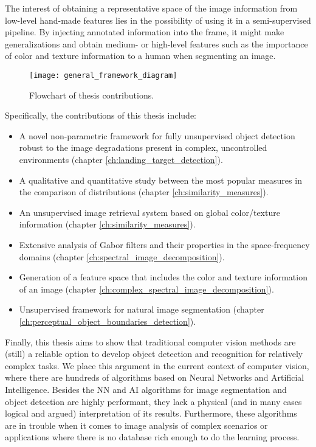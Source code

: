 The interest of obtaining a representative space of the image information from low-level hand-made features lies in the possibility of using it in a semi-supervised pipeline. By injecting annotated information into the frame, it might make generalizations and obtain medium- or high-level features such as the importance of color and texture information to a human when segmenting an image. 

\begin{figure}[!ht]
    \centering
    \texttt{[image: general\_framework\_diagram]}        
    \caption{Flowchart of thesis contributions.}\label{fig:general_diagram_framework}
\end{figure}

Specifically, the contributions of this thesis include:

\begin{itemize}
	\item A novel non-parametric framework for fully unsupervised object detection robust to the image degradations present in complex, uncontrolled environments (chapter \ref{ch:landing_target_detection}).
	\item A qualitative and quantitative study between the most popular measures in the comparison of distributions (chapter \ref{ch:similarity_measures}). 
	\item An unsupervised image retrieval system based on global color/texture information (chapter \ref{ch:similarity_measures}).
	\item Extensive analysis of Gabor filters and their properties in the space-frequency domains (chapter \ref{ch:spectral_image_decomposition}).
	\item Generation of a feature space that includes the color and texture information of an image (chapter \ref{ch:complex_spectral_image_decomposition}).
	\item Unsupervised framework for natural image segmentation (chapter \ref{ch:perceptual_object_boundaries_detection}).
\end{itemize}

Finally, this thesis aims to show that traditional computer vision methods are (still) a reliable option to develop object detection and recognition for relatively complex tasks. We place this argument in the current context of computer vision, where there are hundreds of algorithms based on Neural Networks and Artificial Intelligence. Besides the NN and AI algorithms for image segmentation and object detection are highly performant, they lack a physical (and in many cases logical and argued) interpretation of its results. Furthermore, these algorithms are in trouble when it comes to image analysis of complex scenarios or applications where there is no database rich enough to do the learning process.


